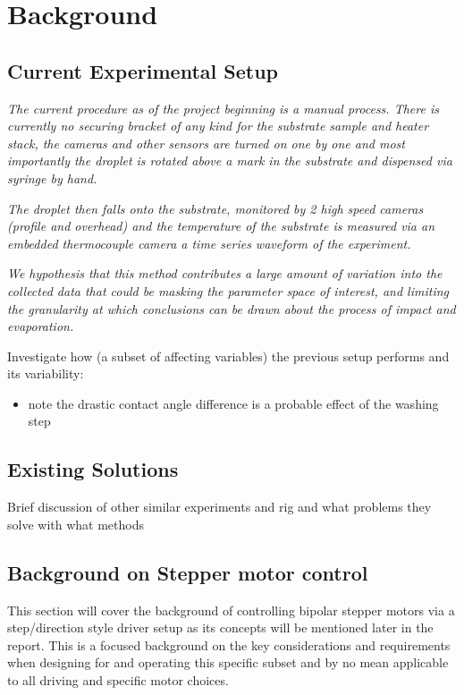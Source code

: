 \chapter{Background}\label{C:back}

\section{Current Experimental Setup}

\textit{The current procedure as of the project beginning is a manual process. There is currently no securing bracket of any kind for the substrate sample and heater stack, the cameras and other sensors are turned on one by one and most importantly the droplet is rotated above a mark in the substrate and dispensed via syringe by hand.}

\textit{The droplet then falls onto the substrate, monitored by 2 high speed cameras (profile and overhead) and the temperature of the substrate is measured via an embedded thermocouple camera a time series waveform of the experiment.}

\textit{We hypothesis that this method contributes a large amount of variation into the collected data that could be masking the parameter space of interest, and limiting the granularity at which conclusions can be drawn about the process of impact and evaporation.}

Investigate how (a subset of affecting variables) the previous setup performs and its variability:
\begin{itemize}
    \item note the drastic contact angle difference is a probable effect of the washing step 
\end{itemize}

\section{Existing Solutions}
Brief discussion of other similar experiments and rig and what problems they solve with what methods

\newpage
\section{Background on Stepper motor control}
This section will cover the background of controlling bipolar stepper motors via a step/direction style driver setup as its concepts will be mentioned later in the report. This is a focused background on the key considerations and requirements when designing for and operating this specific subset and by no mean applicable to all driving and specific motor choices.


